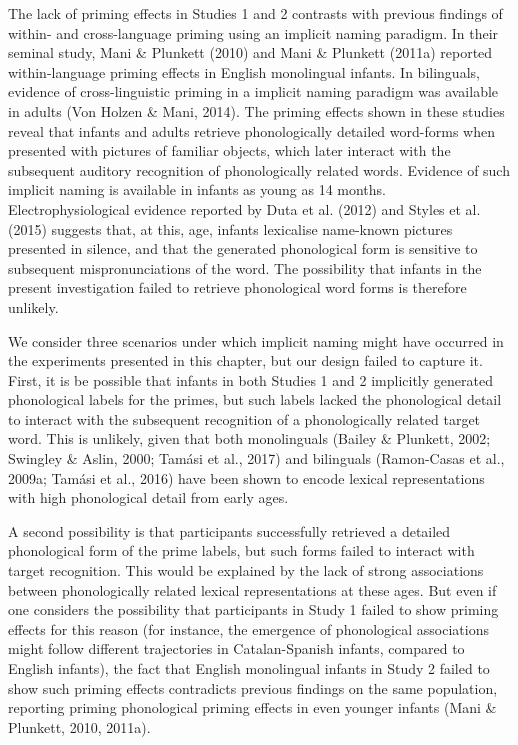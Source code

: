 \documentclass[
  12pt,
  b5paperpaper,
  twoside]{scrreprt}
\begin{document}
The lack of priming effects in Studies 1 and 2 contrasts with previous
findings of within- and cross-language priming using an implicit naming
paradigm. In their seminal study, Mani \& Plunkett (2010) and Mani \&
Plunkett (2011a) reported within-language priming effects in English
monolingual infants. In bilinguals, evidence of cross-linguistic priming
in a implicit naming paradigm was available in adults (Von Holzen \&
Mani, 2014). The priming effects shown in these studies reveal that
infants and adults retrieve phonologically detailed word-forms when
presented with pictures of familiar objects, which later interact with
the subsequent auditory recognition of phonologically related words.
Evidence of such implicit naming is available in infants as young as 14
months. Electrophysiological evidence reported by Duta et al. (2012) and
Styles et al. (2015) suggests that, at this, age, infants lexicalise
name-known pictures presented in silence, and that the generated
phonological form is sensitive to subsequent mispronunciations of the
word. The possibility that infants in the present investigation failed
to retrieve phonological word forms is therefore unlikely.

We consider three scenarios under which implicit naming might have
occurred in the experiments presented in this chapter, but our design
failed to capture it. First, it is be possible that infants in both
Studies 1 and 2 implicitly generated phonological labels for the primes,
but such labels lacked the phonological detail to interact with the
subsequent recognition of a phonologically related target word. This is
unlikely, given that both monolinguals (Bailey \& Plunkett, 2002;
Swingley \& Aslin, 2000; Tamási et al., 2017) and bilinguals
(Ramon-Casas et al., 2009a; Tamási et al., 2016) have been shown to
encode lexical representations with high phonological detail from early
ages.

A second possibility is that participants successfully retrieved a
detailed phonological form of the prime labels, but such forms failed to
interact with target recognition. This would be explained by the lack of
strong associations between phonologically related lexical
representations at these ages. But even if one considers the possibility
that participants in Study 1 failed to show priming effects for this
reason (for instance, the emergence of phonological associations might
follow different trajectories in Catalan-Spanish infants, compared to
English infants), the fact that English monolingual infants in Study 2
failed to show such priming effects contradicts previous findings on the
same population, reporting priming phonological priming effects in even
younger infants (Mani \& Plunkett, 2010, 2011a).
\end{document}
